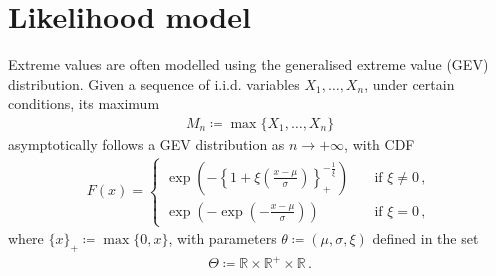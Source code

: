 \documentclass{article}
\newcommand{\R}{\mathbb{R}}
\begin{document}
\section{Likelihood model}
\label{section:model}
%

%
Extreme values are often modelled using the generalised extreme value
(GEV) distribution.
Given a sequence of i.i.d. variables $X_1, \dots, X_n$,
under certain conditions,
its maximum
%
\begin{align*}
	M_n \coloneqq \max\{X_1, \dots, X_{n}\}
\end{align*}
%
asymptotically follows a GEV distribution as $n \to +\infty$,
with CDF
%
\begin{align}
	F(x) =
		\begin{cases}
			\exp\left(-\left\{1 + \xi
			\left(\frac{x - \mu}{\sigma}\right)\right\}_+
			^ {-\frac{1}{\xi}}\right)
			&\quad \text{if $\xi \neq 0$} \,,\\
			\exp(-\exp(-\frac{x - \mu}{\sigma}))
			&\quad \text{if $\xi = 0$} \,,
		\end{cases}
	\label{eq:GEV-CDF}
\end{align}
%
where $\{x\}_+ \coloneqq \max\{0, x\}$, with parameters
$\theta \coloneqq (\mu, \sigma, \xi)$ defined in the set
%
\begin{align}
	\Theta \coloneqq \R \times \R^+ \times \R \,.
	\label{eq:Theta}
\end{align}
%
\end{document}
